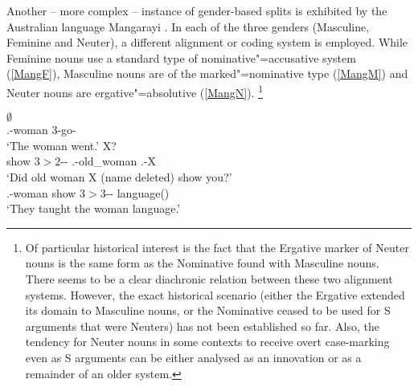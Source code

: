 Another -- more complex -- instance of gender-based splits is exhibited by the Australian language Mangarayi \citep{Merlan:1989}. 
In each of the three genders (Masculine, Feminine and Neuter), a different alignment or coding system is employed. 
While Feminine nouns use a standard type of nominative"=accusative system (\ref{MangF}), Masculine nouns are of the marked"=nominative type (\ref{MangM}) and Neuter nouns are ergative"=absolutive (\ref{MangN}).
\footnote{Of particular historical interest is the fact that the Ergative marker of Neuter nouns is the same form as the Nominative found with Masculine nouns.
 There seems to be a clear diachronic relation between these two alignment systems. 
However, the exact historical scenario (either the Ergative extended its domain to Masculine nouns, or the Nominative ceased to be used for S arguments that were Neuters) has not been established so far. 
Also, the tendency for Neuter nouns in some contexts to receive overt case-marking even as S arguments can be either analysed as an innovation or as a remainder of an older system.}   

 \begin{exe} \ex\label{MangF}
 \begin{xlist} \ex\label{MangFS} \gll {} $\emptyset$\\
 \nom{}.\fem{}-woman 3\sg{}-go-\pstpunc{}\\
\glt `The woman went.'
  \ex\label{MangFA} \gll {}   X?\\
 show 3\sg{}$>$2\sg{}-\aux{}-\pstpunc{} \nom{}.\fem{}-old\_woman \nom{}.\fem{}-X\\
\glt `Did old woman X (name deleted) show you?'
  \ex\label{MangFP} \gll {}   \\
 \acc{}.\fem{}-woman show 3\pl{}$>$3\sg{}-\aux{}-\pstpunc{} language(\neu{})\\
\glt `They taught the woman language.'
 \end{xlist}
 \end{exe}



